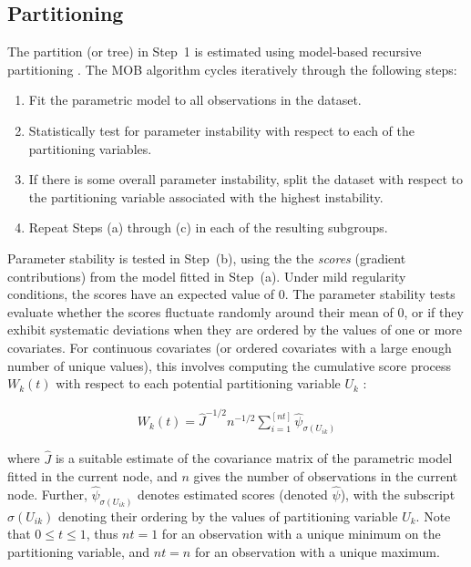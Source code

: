 \documentclass[doc,floatsintext,natbib]{apa7}
\begin{document}
\subsection{Partitioning}

The partition (or tree) in Step~1 is estimated using model-based recursive partitioning \citep[MOB; ][]{ZeilyHoth08}. The MOB algorithm cycles iteratively through the following steps: 

\begin{enumerate}
\setlength\itemsep{0em}
\renewcommand{\labelenumi}{\alph{enumi})}
	\item Fit the parametric model to all observations in the dataset. 
	\item Statistically test for parameter instability with respect to each of the partitioning variables.
	\item If there is some overall parameter instability, split the dataset with respect to the partitioning variable associated with the highest instability.
	\item Repeat Steps (a) through (c) in each of the resulting subgroups.
\end{enumerate}

Parameter stability is tested in Step~(b), using the the \textit{scores} (gradient contributions) from the model fitted in Step~(a). Under mild regularity conditions, the scores have an expected value of 0. The parameter stability tests evaluate whether the scores fluctuate randomly around their mean of 0, or if they exhibit systematic deviations when they are ordered by the values of one or more covariates. For continuous covariates (or ordered covariates with a large enough number of unique values), this involves computing the cumulative score process $W_k(t)$ with respect to each potential partitioning variable $U_k$ \citep{ZeilyHoth08}:

\begin{eqnarray}
\label{eq:efp}
W_{k}(t) = \hat{J}^{-1/2} n^{-1/2} \sum^{[nt]}_{i=1}{\hat{\psi}}_{\sigma(U_{ik})}
\end{eqnarray}

where $\hat{J}$ is a suitable estimate of the covariance matrix of the parametric model fitted in the current node, and $n$ gives the number of observations in the current node. Further, $\hat{\psi}_{\sigma(U_{ik})}$ denotes estimated scores (denoted $\hat{\psi}$), with the subscript {$\sigma(U_{ik})$} denoting their ordering by the values of partitioning variable $U_k$. Note that $0 \leq t \leq 1$, thus $nt = 1$ for an observation with a unique minimum on the partitioning variable, and $nt = n$ for an observation with a unique maximum. 
\end{document}
